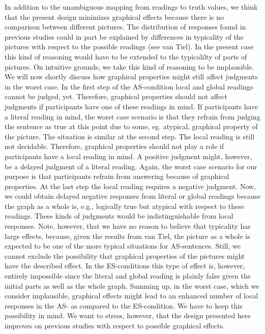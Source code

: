 \documentclass[a4paper,10pt]{article}
\begin{document}
In addition to the unambiguous mapping from readings to truth values, we think that the present design minimizes graphical effects because there is no comparison between different pictures. The distribution of responses found in previous studies could in part be explained by differences in typicality of the pictures with respect to the possible readings (see van Tiel). In the present case this kind of reasoning would have to be extended to the typicalilty of parts of pictures. On intuitive grounds, we take this kind of reasoning to be implausible. We will now shortly discuss how graphical properties might still affect judgments in the worst case. In the first step of the AS-condition local and global readings cannot be judged, yet. Therefore, graphical properties should not affect judgments if participants have one of these readings in mind. If participants have a literal reading in mind, the worst case scenario is that they refrain from judging the sentence as true at this point due to some, eg. atypical, graphical property of the picture. The situation is similar at the second step. The local reading is still not decidable. Therefore, graphical properties should not play a role if participants have a local reading in mind. A positive judgment might, however, be a delayed judgment of a literal reading. Again, the worst case scenario for our purpose is that participants refrain from answering because of graphical properties. At the last step the local reading requires a negative judgment. Now, we could obtain delayed negative responses from literal or global readings because the graph as a whole is, e.g., logically true but atypical with respect to these readings. These kinds of judgments would be indistinguishable from local responses. Note, however, that we have no reason to believe that typicality has large effects,  because, given the results from van Tiel, the picture as a whole is expected to be one of the more typical situations for AS-sentences. Still, we cannot exclude the possibility that graphical properties of the pictures might have the described effect. In the ES-conditions this type of effect is, however, entirely impossible since the  literal and global reading is plainly false given the initial parts as well as the whole graph. Summing up, in the worst case, which we consider implausible, graphical effects might lead to an enhanced number of local responses in the AS- as compared to the ES-condition. We have to keep this possibility in mind. We want to stress, however, that the design presented here improves on previous studies with respect to possible graphical effects.
\end{document}
